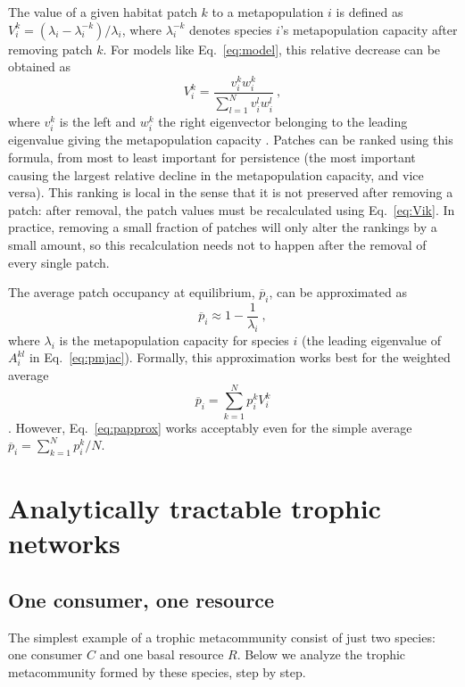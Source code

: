 \documentclass[11pt]{article}
\newcommand{\ol}[1]{\overline{#1}}
\begin{document}
The value of a given habitat patch $k$ to a metapopulation $i$ is defined as $V_i^k = (\lambda_i - \lambda_i^{-k}) / \lambda_i$, where $\lambda_i^{-k}$ denotes species $i$'s  metapopulation capacity after removing patch $k$. For models like Eq.~\ref{eq:model}, this relative decrease can be obtained as
\begin{equation}
  \label{eq:Vik}
  V_i^k = \frac{v_i^k w_i^k}{\sum_{l=1}^N v_i^l w_i^l} \ ,
\end{equation}
where $v_i^k$ is the left and $w_i^k$ the right eigenvector belonging to the leading eigenvalue giving the metapopulation capacity \citep{OvaskainenHanski2001}. Patches can be ranked using this formula, from most to least important for persistence (the most important causing the largest relative decline in the metapopulation capacity, and vice versa). This ranking is local in the sense that it is not preserved after removing a patch: after removal, the patch values must be recalculated using Eq.~\ref{eq:Vik}. In practice, removing a small fraction of patches will only alter the rankings by a small amount, so this recalculation needs not to happen after the removal of every single patch.

The average patch occupancy at equilibrium, $\ol{p}_i$, can be approximated as
\begin{equation}
  \label{eq:papprox}
  \ol{p}_i \approx 1 - \frac{1}{\lambda_i} \ ,
\end{equation}
where $\lambda_i$ is the metapopulation capacity for species $i$ (the leading eigenvalue of $A_i^{kl}$ in Eq.~\ref{eq:pmjac}). Formally, this approximation works best for the weighted average
\begin{equation}
  \label{eq:weighted}
  \ol{p}_i = \sum_{k=1}^N p_i^k V_i^k
\end{equation}
\citep{OvaskainenHanski2001}. However, Eq.~\ref{eq:papprox} works acceptably even for the simple average $\ol{p}_i = \sum_{k=1}^N p_i^k / N$.


\section{Analytically tractable trophic networks} \label{sec:anal}

\subsection{One consumer, one resource} \label{sec:CR}

The simplest example of a trophic metacommunity consist of just two species: one consumer $C$ and one basal resource $R$. Below we analyze the trophic metacommunity formed by these species, step by step.
\end{document}
